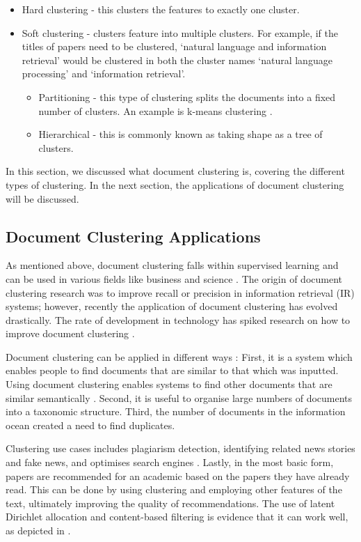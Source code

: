\begin{itemize}
\item Hard clustering - this clusters the features to exactly one cluster.
\item Soft clustering - clusters feature into multiple clusters. For example, if the titles of papers need to be clustered, ‘natural language and information retrieval’ would be clustered in both the cluster names ‘natural language processing’ and ‘information retrieval’.
\begin{itemize}
    \item Partitioning - this type of clustering splits the documents into a fixed number of clusters. An example is k-means clustering \cite{chen2010integration}.
    \item Hierarchical - this is commonly known as taking shape as a tree of clusters.
  \end{itemize}
\end{itemize}

In this section, we discussed what document clustering is, covering the different types of clustering. In the next section, the applications of document clustering will be discussed.

\subsection{Document Clustering Applications}

As mentioned above, document clustering falls within supervised learning and can be used in various fields like business and science \cite{jain2010data}. The origin of document clustering research was to improve recall or precision in information retrieval (IR) systems; however, recently the application of document clustering has evolved drastically. The rate of development in technology has spiked research on how to improve document clustering \cite{alhawarat2018revisiting,mekonnen2017topic}. 

Document clustering can be applied  in different ways \cite{jajoo2008document,abualigah2017text}: First, it is a system which enables people to find documents that are similar to that which was inputted. Using document clustering enables systems to find other documents that are similar semantically \cite{Shah2013}. Second, it is useful to organise large numbers of documents into a taxonomic structure. Third, the number of documents in the information ocean created a need to find duplicates. 

Clustering use cases includes plagiarism detection, identifying related news stories and fake news, and optimises search engines \cite{jin2016news}. Lastly, in the most basic form, papers are recommended for an academic based on the papers they have already read. This can be done by using clustering and employing other features of the text, ultimately improving the quality of recommendations. The use of latent Dirichlet allocation and content-based filtering is evidence that it can work well, as depicted in .

